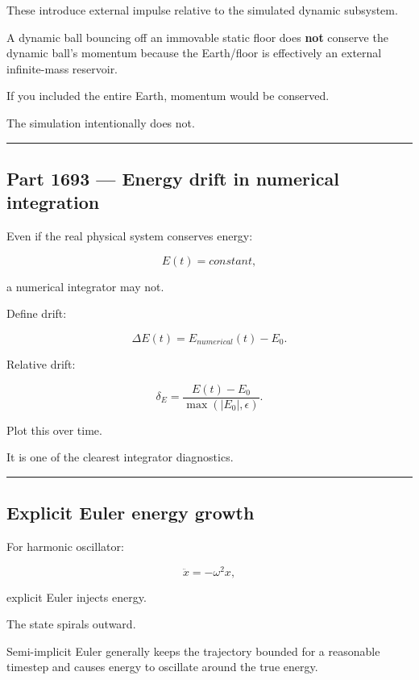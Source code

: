 These introduce external impulse relative to the simulated dynamic subsystem.

A dynamic ball bouncing off an immovable static floor does \textbf{not} conserve the dynamic ball's momentum because the Earth/floor is effectively an external infinite-mass reservoir.

If you included the entire Earth, momentum would be conserved.

The simulation intentionally does not.

\begin{center}\rule{0.5\linewidth}{0.5pt}\end{center}

\subsection{Part 1693 --- Energy drift in numerical integration}\label{06-engine-ii-ch039-part-1693-energy-drift-in-numerical-integration}

Even if the real physical system conserves energy:

\[
E(t)=constant,
\]

a numerical integrator may not.

Define drift:

\[
\boxed{
\Delta E(t)
=
E_{numerical}(t)-E_0.
}
\]

Relative drift:

\[
\boxed{
\delta_E
=
\frac{E(t)-E_0}
{\max(|E_0|,\epsilon)}.
}
\]

Plot this over time.

It is one of the clearest integrator diagnostics.

\begin{center}\rule{0.5\linewidth}{0.5pt}\end{center}

\subsection{Explicit Euler energy growth}\label{06-engine-ii-ch039-explicit-euler-energy-growth}

For harmonic oscillator:

\[
\ddot x=-\omega^2x,
\]

explicit Euler injects energy.

The state spirals outward.

Semi-implicit Euler generally keeps the trajectory bounded for a reasonable timestep and causes energy to oscillate around the true energy.

